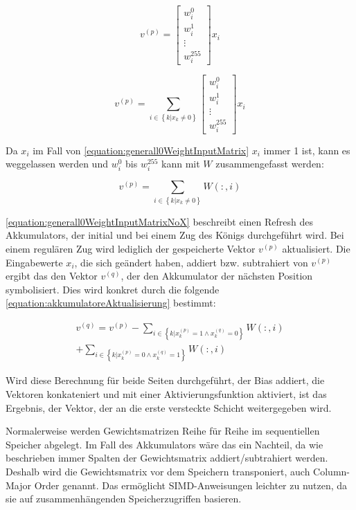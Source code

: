 \begin{equation}
  v^{(p)} = \begin{bmatrix}
    w_{i}^{0} \\
    w_{i}^{1} \\
    \vdots    \\
    w_{i}^{255}
  \end{bmatrix} x_{i}
  \label{equation:ithl0WeightInputMatrix}
\end{equation}

\begin{equation}
  v^{(p)} = \sum_{i\in\left \{  k|x_{k}\neq 0\right \}} \begin{bmatrix}
    w_{i}^{0} \\
    w_{i}^{1} \\
    \vdots    \\
    w_{i}^{255}
  \end{bmatrix} x_{i}
  \label{equation:generall0WeightInputMatrix}
\end{equation}

Da $x_{i}$ im Fall von \autoref{equation:generall0WeightInputMatrix} $x_{i}$ immer 1 ist, kann es weggelassen werden und $w_{i}^{0}$ bis $w_{i}^{255}$ kann mit $W$ zusammengefasst werden:

\begin{equation}
  v^{(p)} = \sum_{i\in\left \{  k|x_{k}\neq 0\right \}} W(:,i)
  \label{equation:generall0WeightInputMatrixNoX}
\end{equation}

\autoref{equation:generall0WeightInputMatrixNoX} beschreibt einen Refresh des Akkumulators, der initial und bei einem Zug des Königs durchgeführt wird. Bei einem regulären Zug wird lediglich der gespeicherte Vektor $v^{(p)}$ aktualisiert. Die Eingabewerte $x_{i}$, die sich geändert haben, addiert bzw. subtrahiert von $v^{(p)}$ ergibt das den Vektor $v^{(q)}$, der den Akkumulator der nächsten Position symbolisiert. Dies wird konkret durch die folgende \autoref{equation:akkumulatoreAktualisierung} bestimmt:

\begin{equation}
  \begin{split}
    v^{(q)} = v^{(p)}
    - \sum_{i \in \left \{ k | x_{k}^{(p)}=1\wedge x_{k}^{(q)}=0 \right \}}^{} W(:,i) \\
    + \sum_{i \in \left \{ k | x_{k}^{(p)}=0\wedge x_{k}^{(q)}=1 \right \}}^{} W(:,i)
  \end{split}
  \label{equation:akkumulatoreAktualisierung}
\end{equation}

Wird diese Berechnung für beide Seiten durchgeführt, der Bias addiert, die Vektoren konkateniert und mit einer Aktivierungsfunktion aktiviert, ist das Ergebnis, der Vektor, der an die erste versteckte Schicht weitergegeben wird.

Normalerweise werden Gewichtsmatrizen Reihe für Reihe im sequentiellen Speicher abgelegt. Im Fall des Akkumulators wäre das ein Nachteil, da wie beschrieben immer Spalten der Gewichtsmatrix addiert/subtrahiert werden. Deshalb wird die Gewichtsmatrix vor dem Speichern transponiert, auch Column-Major Order genannt. Das ermöglicht \ac{SIMD}-Anweisungen leichter zu nutzen, da sie auf zusammenhängenden Speicherzugriffen basieren.